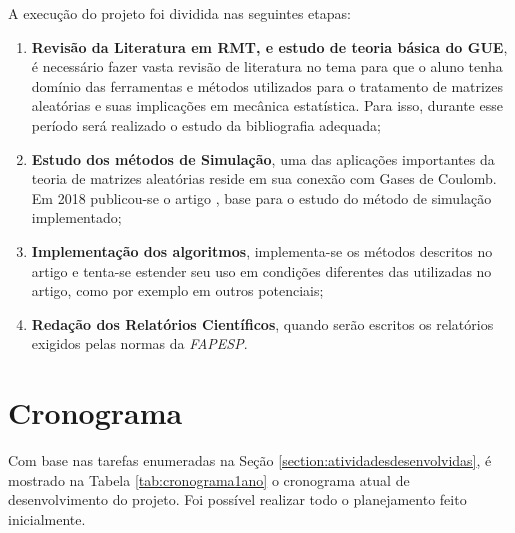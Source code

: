 \documentclass[12pt]{report}
\begin{document}
A execução do projeto foi dividida nas seguintes etapas:

\begin{enumerate}
	\item \textbf{Revisão da Literatura em RMT, e estudo de teoria básica do GUE}, é necessário fazer vasta revisão de literatura no tema para que o aluno tenha domínio das ferramentas e métodos utilizados para o tratamento de matrizes aleatórias e suas implicações em mecânica estatística. Para isso, durante esse período será realizado o estudo da bibliografia adequada;
	
	\item \textbf{Estudo dos métodos de Simulação}, uma das aplicações importantes da teoria de matrizes aleatórias reside em sua conexão com Gases de Coulomb. Em 2018 publicou-se o artigo \cite{Chafa2018}, base para o estudo do método de simulação implementado;
	
	\item \textbf{Implementação dos algoritmos}, implementa-se os métodos descritos no artigo e tenta-se estender seu uso em condições diferentes das utilizadas no artigo, como por exemplo em outros potenciais;
	
	\item \textbf{Redação dos Relatórios Científicos}, quando serão escritos os relatórios exigidos pelas normas da \textit{FAPESP}.
	
\end{enumerate}

\section{Cronograma}

Com base nas tarefas enumeradas na Seção \ref{section:atividadesdesenvolvidas}, é mostrado na Tabela \ref{tab:cronograma1ano} o cronograma atual de desenvolvimento do projeto. Foi possível realizar todo o planejamento feito inicialmente.

\end{document}
